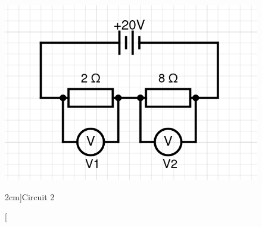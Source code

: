 \documentclass[a4paper,openany,nobib]{tufte-book}
\begin{document}
\begin{figure}[h!]
	\center
	\includegraphics[width=\linewidth]{circ2}
	\caption[][2cm]{Circuit 2}
\end{figure}
\newpage
\end{document}
